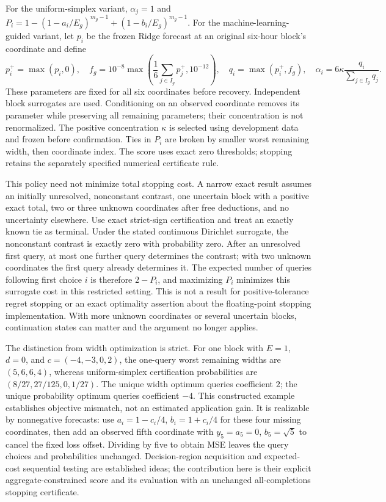 For the uniform-simplex variant, $\alpha_j=1$ and
$P_i=1-(1-a_i/E_g)^{m_g-1}+(1-b_i/E_g)^{m_g-1}$.
For the machine-learning-guided variant, let $p_i$ be the frozen Ridge
forecast at an original six-hour block's coordinate and define
\[
 p_i^+=\max(p_i,0),\quad
 f_g=10^{-8}\max\!\left(\frac{1}{6}\sum_{j\in I_g}p_j^+,10^{-12}\right),
 \quad q_i=\max(p_i^+,f_g),\quad
 \alpha_i=6\kappa\frac{q_i}{\sum_{j\in I_g}q_j}.
\]
These parameters are fixed for all six coordinates before recovery.
Independent block surrogates are used. Conditioning on an observed
coordinate removes its parameter while preserving all remaining parameters;
their concentration is not renormalized. The positive concentration
$\kappa$ is selected using development data and frozen before confirmation.
Ties in $P_i$ are broken by smaller worst remaining width, then coordinate
index. The score uses exact zero thresholds; stopping retains the separately
specified numerical certificate rule.

This policy need not minimize total stopping cost. A narrow exact result
assumes an initially unresolved, nonconstant contrast, one uncertain block
with a positive exact total, two or three unknown coordinates after free
deductions, and no uncertainty elsewhere. Use exact strict-sign
certification and treat an exactly known tie as terminal. Under the stated
continuous Dirichlet surrogate, the nonconstant contrast is exactly zero
with probability zero. After an unresolved first query, at most one further
query determines the contrast; with two unknown coordinates the first
query already determines it. The expected number of queries following
first choice $i$ is therefore $2-P_i$, and maximizing $P_i$ minimizes this
surrogate cost in this restricted setting. This is not a result for
positive-tolerance regret stopping or an exact optimality assertion about
the floating-point stopping implementation. With more unknown coordinates
or several uncertain blocks, continuation states can matter and the
argument no longer applies.

The distinction from width optimization is strict. For one block with
$E=1$, $d=0$, and $c=(-4,-3,0,2)$, the one-query worst remaining widths are
$(5,6,6,4)$, whereas uniform-simplex certification probabilities are
$(8/27,27/125,0,1/27)$. The unique width optimum queries coefficient $2$;
the unique probability optimum queries coefficient $-4$. This constructed
example establishes objective mismatch, not an estimated application gain.
It is realizable by nonnegative forecasts: use $a_i=1-c_i/4$,
$b_i=1+c_i/4$ for these four missing coordinates, then add an observed
fifth coordinate with $y_5=a_5=0$, $b_5=\sqrt5$ to cancel the fixed
loss offset. Dividing by five to obtain MSE leaves the query choices
and probabilities unchanged.
Decision-region acquisition and expected-cost sequential testing are
established ideas; the contribution here is their explicit
aggregate-constrained score and its evaluation with an unchanged
all-completions stopping certificate.

